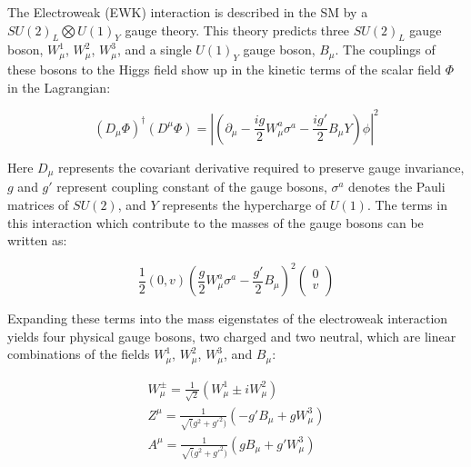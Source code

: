The Electroweak (EWK) interaction is described in the SM by a $SU(2)_L\bigotimes U(1)_Y$ gauge theory. This theory predicts three $SU(2)_L$ gauge boson, $W^1_\mu$, $W^2_\mu$, $W^3_\mu$, and a single $U(1)_Y$ gauge boson, $B_\mu$. The couplings of these bosons to the Higgs field show up in the kinetic terms of the scalar field $\Phi$ in the Lagrangian:

\begin{equation}
  \label{eq:Lphi}
  (D_\mu\Phi)^\dagger(D^\mu\Phi) = |(\partial_\mu - \frac{ig}{2}W^a_\mu\sigma^a - \frac{ig'}{2}B_\mu Y)\phi|^2
\end{equation}

Here $D_\mu$ represents the covariant derivative required to preserve gauge invariance, $g$ and $g'$ represent coupling constant of the gauge bosons, $\sigma^a$ denotes the Pauli matrices of $SU(2)$, and $Y$ represents the hypercharge of $U(1)$. The terms in this interaction which contribute to the masses of the gauge bosons can be written as:

\begin{equation}
  \label{eq:LVEV}
  \frac{1}{2}(0,v)(\frac{g}{2}W^a_\mu\sigma^a - \frac{g'}{2}B_\mu)^2
  \begin{pmatrix}                                                                                                                               
    0 \\                                                                                                                                        
    v \\                                                                                                                                        
  \end{pmatrix}
\end{equation}

Expanding these terms into the mass eigenstates of the electroweak interaction yields four physical gauge bosons, two charged and two neutral, which are linear combinations of the fields $W^1_\mu$, $W^2_\mu$, $W^3_\mu$, and $B_\mu$:

\begin{equation}
\begin{gathered}
  \label{eq:EWKfields}
  W^\pm_\mu = \frac{1}{\sqrt{2}}(W^1_\mu \pm i W^2_\mu) \\
  Z^\mu = \frac{1}{\sqrt(g^2+g'^2)}(-g'B_\mu + gW^3_\mu) \\
  A^\mu = \frac{1}{\sqrt(g^2+g'^2)}(gB_\mu + g'W^3_\mu) \\
\end{gathered}
\end{equation}

